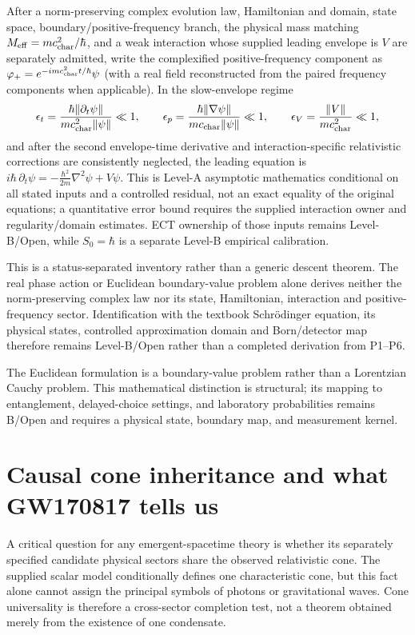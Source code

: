 \documentclass[11pt,a4paper]{article}
\begin{document}
After a norm-preserving complex evolution law, Hamiltonian and domain, state space, boundary/positive-frequency branch, the physical mass matching $M_{\rm eff}=m c_{\rm char}^2/\hbar$, and a weak interaction whose supplied leading envelope is $V$ are separately admitted, write the complexified positive-frequency component as $\varphi_+=e^{-imc_{\rm char}^2t/\hbar}\psi$ (with a real field reconstructed from the paired frequency components when applicable).  In the slow-envelope regime
\[
 \epsilon_t=\frac{\hbar\|\partial_t\psi\|}{mc_{\rm char}^2\|\psi\|}\ll1,
 \qquad
 \epsilon_p=\frac{\hbar\|\nabla\psi\|}{mc_{\rm char}\|\psi\|}\ll1,
 \qquad
 \epsilon_V=\frac{\|V\|}{mc_{\rm char}^2}\ll1,
\]
and after the second envelope-time derivative and interaction-specific relativistic corrections are consistently neglected, the leading equation is $i\hbar\,\partial_t\psi = -\frac{\hbar^2}{2m}\nabla^2\psi + V\psi$.  This is Level-A asymptotic mathematics conditional on all stated inputs and a controlled residual, not an exact equality of the original equations; a quantitative error bound requires the supplied interaction owner and regularity/domain estimates.  ECT ownership of those inputs remains Level-B/Open, while $S_0=\hbar$ is a separate Level-B empirical calibration.

This is a status-separated inventory rather than a generic descent theorem.  The real phase action or Euclidean boundary-value problem alone derives neither the norm-preserving complex law nor its state, Hamiltonian, interaction and positive-frequency sector.  Identification with the textbook Schr\"odinger equation, its physical states, controlled approximation domain and Born/detector map therefore remains Level-B/Open rather than a completed derivation from P1--P6.

The Euclidean formulation is a boundary-value problem rather than a Lorentzian Cauchy problem. This mathematical distinction is structural; its mapping to entanglement, delayed-choice settings, and laboratory probabilities remains B/Open and requires a physical state, boundary map, and measurement kernel.

\FloatBarrier

\section{Causal cone inheritance and what GW170817 tells us}
\label{sec:pop_cone}

A critical question for any emergent-spacetime theory is whether its separately specified candidate physical sectors share the observed relativistic cone.  The supplied scalar model conditionally defines one characteristic cone, but this fact alone cannot assign the principal symbols of photons or gravitational waves.  Cone universality is therefore a cross-sector completion test, not a theorem obtained merely from the existence of one condensate.
\end{document}
